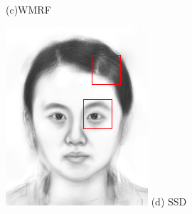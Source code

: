 \documentclass[10pt,twocolumn,letterpaper]{article}
\begin{document}
\begin{figure}[t]
\begin{minipage}[t]{0.24\linewidth}
(c)WMRF\cite{zhou2012markov}
\end{minipage}
\begin{minipage}[t]{0.24\linewidth}
\centering
\includegraphics[width=1\linewidth]{img/example_ssd.png}
(d) SSD\cite{song2014real}
\end{minipage}
\begin{minipage}[t]{0.24\linewidth}
\centering

\end{minipage}
\end{figure}
\end{document}
